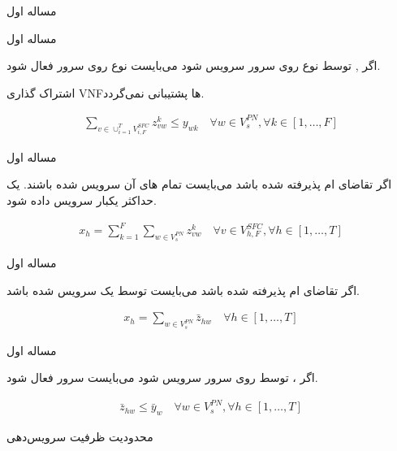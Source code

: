\documentclass{beamer}
\begin{document}
\begin{persian}
\begin{frame}{مساله اول}
\end{frame}
\begin{frame}{مساله اول}
	\par
	اگر , 
	توسط  نوع 
	روی سرور  سرویس شود می‌بایست
	 نوع 
	روی سرور  فعال شود.
	\par
	اشتراک گذاری VNFها پشتیبانی نمی‌گردد.
	\begin{latin}\begin{align}
	\sum_{v \in \cup_{i=1}^T V_{i, F}^{SFC}} z_{vw}^k \le y_{wk}
	\quad
	\forall w \in V_s^{PN}, \forall k \in [1,\ldots, F]
	\end{align}\end{latin}
\end{frame}
\begin{frame}{مساله اول}
	\par
	اگر تقاضای ام پذیرفته شده باشد
	می‌بایست تمام های آن‌
	سرویس شده باشند.
	یک  حداکثر یکبار سرویس داده شود.
	\begin{latin}\begin{align}
		x_h = \sum_{k=1}^{F} \sum_{w \in V_{s}^{PN}} z_{vw}^{k}
		\quad
		\forall v \in V_{h,F}^{SFC}, \forall h \in [1,\ldots, T]
	\end{align}\end{latin}
\end{frame}
\begin{frame}{مساله اول}
	\par
	اگر تقاضای ام پذیرفته شده باشد
	می‌بایست توسط یک  سرویس شده باشد.
	\begin{latin}\begin{align}
		x_h = \sum_{w \in V_{s}^{PN}} \bar{z}_{hw}
		\quad
		\forall h \in [1,\ldots, T]
	\end{align}\end{latin}
\end{frame}
\begin{frame}{مساله اول}
	\par
	اگر ، 
	توسط  روی سرور 
	سرویس شود می‌بایست  سرور 
	فعال شود.
	\begin{latin}\begin{align}
		\bar{z}_{hw} \le \bar{y}_w
		\quad
		\forall w \in V_{s}^{PN}, \forall h \in [1,\ldots, T]
	\end{align}\end{latin}
	\par
	محدودیت ظرفیت سرویس‌دهی 
	\begin{latin}\begin{align}

\end{align}
\end{latin}
\end{frame}
\end{persian}
\end{document}
